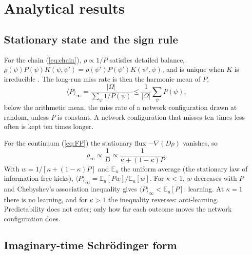 \documentclass[pre,twocolumn,superscriptaddress,showpacs=false,amsmath,amssymb,nofootinbib]{revtex4-2}
\begin{document}
\section{Analytical results}\label{sec:results}

\subsection{Stationary state and the sign rule}

For the chain (\ref{eq:chain}), $\rho\propto1/P$ satisfies detailed balance, $\rho(\psi)P(\psi)K(\psi,\psi')=\rho(\psi')P(\psi')K(\psi',\psi)$, and is unique when $K$ is irreducible \cite{Norris1997}. The long-run miss rate is then the harmonic mean of $P$,
\begin{equation}
\langle P\rangle_\infty=\frac{|\Omega|}{\sum_\psi1/P(\psi)}\le\frac1{|\Omega|}\sum_\psi P(\psi),
\label{eq:harmonic}
\end{equation}
below the arithmetic mean, the miss rate of a network configuration drawn at random, unless $P$ is constant. A network configuration that misses ten times less often is kept ten times longer.

For the continuum (\ref{eq:FP}) the stationary flux $-\nabla(D\rho)$ vanishes, so
\begin{equation}
\rho_\infty\propto\frac1D\propto\frac1{\kappa+(1-\kappa)P}.
\label{eq:rho}
\end{equation}
With $w=1/[\kappa+(1-\kappa)P]$ and $\mathbb E_u$ the uniform average (the stationary law of information-free kicks), $\langle P\rangle_\infty=\mathbb E_u[Pw]/\mathbb E_u[w]$. For $\kappa<1$, $w$ decreases with $P$ and Chebyshev's association inequality \cite{Chebyshev1882} gives $\langle P\rangle_\infty<\mathbb E_u[P]$: learning. At $\kappa=1$ there is no learning, and for $\kappa>1$ the inequality reverses: anti-learning. Predictability does not enter; only how far each outcome moves the network configuration does.

\subsection{Imaginary-time Schr\"odinger form}
\end{document}
